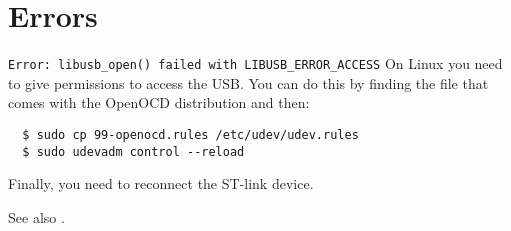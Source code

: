 \section{Errors}
\label{openocd_errors}

\verb+Error: libusb_open() failed with LIBUSB_ERROR_ACCESS+ On Linux
you need to give permissions to access the USB.  You can do this by
finding the file  that comes with the OpenOCD
distribution and then:
%
\begin{verbatim}
  $ sudo cp 99-openocd.rules /etc/udev/udev.rules
  $ sudo udevadm control --reload
\end{verbatim}
%
Finally, you need to reconnect the ST-link device.


See also .
